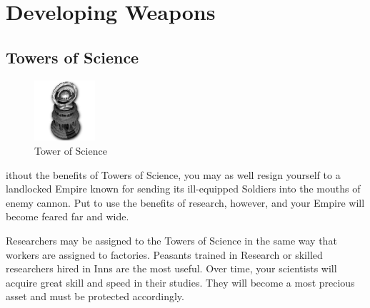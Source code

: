 
\chapter{Developing Weapons}


\section{Towers of Science}


\begin{figure}
	\vspace{-20pt}
	\begin{center}
		\includegraphics[width=0.2\textwidth]{Itower}
		\\ Tower of Science
	\end{center}
	\vspace{-20pt}
\end{figure}

ithout the benefits of Towers of Science, you may as well resign yourself to a landlocked Empire known for sending its ill-equipped Soldiers into the mouths of enemy cannon. Put to use the benefits of research, however, and your Empire will become feared far and wide.

Researchers may be assigned to the Towers of Science in the same way that workers are assigned to factories. Peasants trained in Research or skilled researchers hired in Inns are the most useful. Over time, your scientists will acquire great skill and speed in their studies. They will become a most precious asset and must be protected accordingly.

